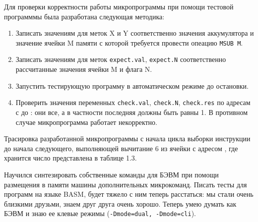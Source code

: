 Для проверки корректности работы микропрограммы при помощи тестовой программмы была разработана следующая методика:
\begin{enumerate}
    \item Записать значениям для меток X и Y соответственно значения аккумулятора и значение ячейки M памяти с которой требуется провести опеацию \verb|MSUB M|.
    \item Записать значениям для меток \verb|expect.val|, \verb|expect.N| соответственно рассчитанные значения ячейки M и флага N.
    \item Запустить тестирующую программу в автоматическом режиме до остановки.
    \item Проверить значения переменных \verb|check.val|, \verb|check.N|, \verb|check.res| по адресам с  до : они все, а в частности последняя должны быть равны 1. В противном случае микропрограмма работает некорректно.
\end{enumerate}


Трасировка разработанной микропрограммы с начала цикла выборки инструкции до начала следующего, выполняющей вычитание 6 из ячейки с адресом , где хранится число  представлена в таблице 1.3.


Научился синтезировать собственные команды для БЭВМ при помощи размещения в памяти машины дополнительных микрокоманд. Писать тесты для программ на языке BASM, будет тяжело с ним теперь расстаться: мы стали очень близкими друзьми, знаем друг друга очень хорошо. Теперь умею думать как БЭВМ и знаю ее клевые режимы (\verb|-Dmode=dual, -Dmode=cli|).
\newpage





